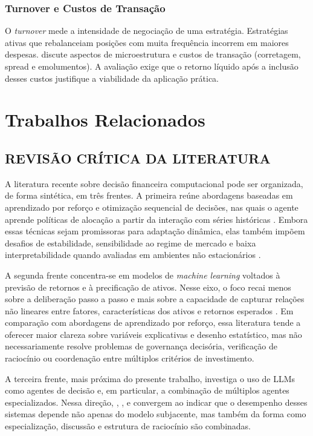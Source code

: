 \documentclass{eic-bcc-tcc}
\begin{document}
\subsection{Turnover e Custos de Transação}
O \textit{turnover} mede a intensidade de negociação de uma estratégia. Estratégias ativas que rebalanceiam posições com muita frequência incorrem em maiores despesas. \citet{Harris2003} discute aspectos de microestrutura e custos de transação (corretagem, spread e emolumentos). A avaliação exige que o retorno líquido após a inclusão desses custos justifique a viabilidade da aplicação prática.

\chapter{Trabalhos Relacionados}
\label{cha:relacionados}

\section{REVISÃO CRÍTICA DA LITERATURA}

A literatura recente sobre decisão financeira computacional pode ser organizada, de forma sintética, em três frentes. A primeira reúne abordagens baseadas em aprendizado por reforço e otimização sequencial de decisões, nas quais o agente aprende políticas de alocação a partir da interação com séries históricas \citep{Moody2001, SuttonBarto2018, Schulman2017, Jiang2017}. Embora essas técnicas sejam promissoras para adaptação dinâmica, elas também impõem desafios de estabilidade, sensibilidade ao regime de mercado e baixa interpretabilidade quando avaliadas em ambientes não estacionários \citep{Jiang2017}.

A segunda frente concentra-se em modelos de \textit{machine learning} voltados à previsão de retornos e à precificação de ativos. Nesse eixo, o foco recai menos sobre a deliberação passo a passo e mais sobre a capacidade de capturar relações não lineares entre fatores, características dos ativos e retornos esperados \citep{Gu2020}. Em comparação com abordagens de aprendizado por reforço, essa literatura tende a oferecer maior clareza sobre variáveis explicativas e desenho estatístico, mas não necessariamente resolve problemas de governança decisória, verificação de raciocínio ou coordenação entre múltiplos critérios de investimento.

A terceira frente, mais próxima do presente trabalho, investiga o uso de LLMs como agentes de decisão e, em particular, a combinação de múltiplos agentes especializados. Nessa direção, \citet{Xia2026}, \citet{Li2023}, \citet{Xing2024} e \citet{FinCoT2026} convergem ao indicar que o desempenho desses sistemas depende não apenas do modelo subjacente, mas também da forma como especialização, discussão e estrutura de raciocínio são combinadas.
\end{document}
